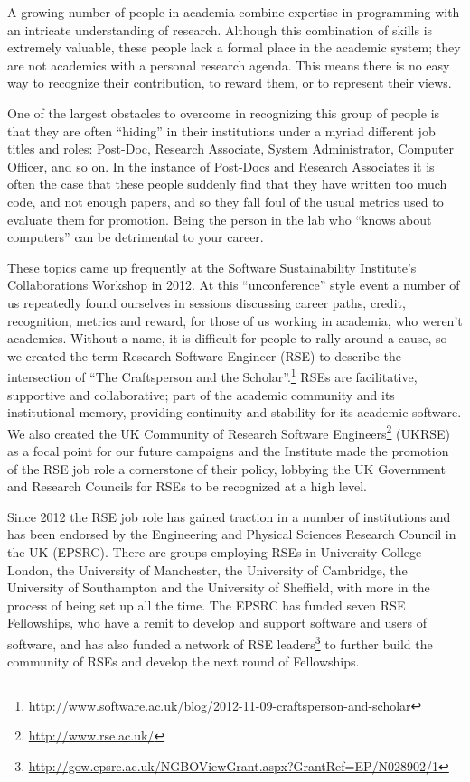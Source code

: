 \documentclass[a4paper,UKenglish]{dagrep}
\begin{document}
A growing number of people in academia combine expertise in programming with an intricate understanding of research. Although this combination of skills is extremely valuable, these people lack a formal place in the academic system; they are not academics with a personal research agenda. This means there is no easy way to recognize their contribution, to reward them, or to represent their views.

One of the largest obstacles to overcome in recognizing this group of people is that they are often ``hiding'' in their institutions under a myriad different job titles and roles: Post-Doc, Research Associate, System Administrator, Computer Officer, and so on. In the instance of Post-Docs and Research Associates it is often the case that these people suddenly find that they have written too much code, and not enough papers, and so they fall foul of the usual metrics used to evaluate them for promotion. Being the person in the lab who ``knows about computers'' can be detrimental to your career.

These topics came up frequently at the Software Sustainability Institute's Collaborations Workshop in 2012. At this ``unconference'' style event a number of us repeatedly found ourselves in sessions discussing career paths, credit, recognition, metrics and reward, for those of us working in academia, who weren't academics. Without a name, it is difficult for people to rally around a cause, so we created the term Research Software Engineer (RSE) to describe the intersection of ``The Craftsperson and the Scholar''.\footnote{\url{http://www.software.ac.uk/blog/2012-11-09-craftsperson-and-scholar}}
RSEs are facilitative, supportive and collaborative; part of the academic community and its institutional memory, providing continuity and stability for its academic software. We also created the UK Community of Research Software Engineers\footnote{\url{http://www.rse.ac.uk/}} (UKRSE) as a focal point for our future campaigns and the Institute made the promotion of the RSE job role a cornerstone of their policy, lobbying the UK Government and Research Councils for RSEs to be recognized at a high level.

Since 2012 the RSE job role has gained traction in a number of institutions and has been endorsed by the Engineering and Physical Sciences Research Council in the UK (EPSRC). There are groups employing RSEs in University College London, the University of Manchester, the University of Cambridge, the University of Southampton and the University of Sheffield, with more in the process of being set up all the time. The EPSRC has funded seven RSE Fellowships, who have a remit to develop and support software and users of software, and has also funded a network of RSE leaders\footnote{\url{http://gow.epsrc.ac.uk/NGBOViewGrant.aspx?GrantRef=EP/N028902/1}} to further build the community of RSEs and develop the next round of Fellowships.
\end{document}

